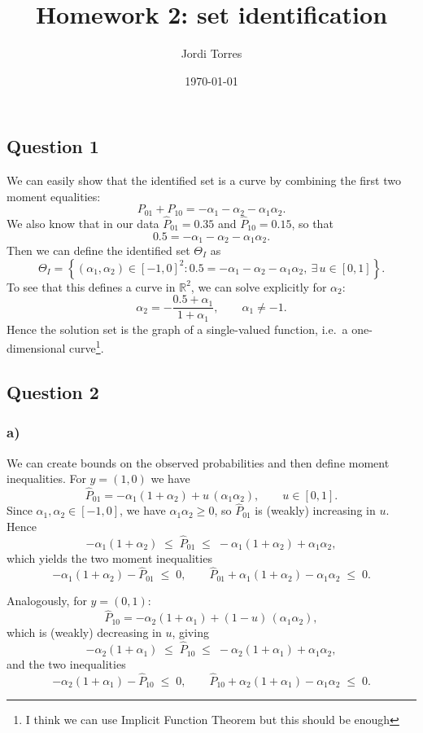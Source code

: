 \documentclass{article}
\begin{document}
\title{Homework 2: set identification}
\author{Jordi Torres}
\date{\today}


\maketitle


\subsection*{Question 1}
We can easily show that the identified set is a curve by combining the first two moment equalities:
\[
P_{01}+P_{10}= -\alpha_1 -\alpha_2- \alpha_1\alpha_2.
\]
We also know that in our data $\hat{P}_{01}=0.35$ and $\hat{P}_{10}=0.15$, so that
\[
0.5= -\alpha_1 -\alpha_2- \alpha_1\alpha_2.
\]
Then we can define the identified set $\Theta_I$ as
\[
\Theta_I= \left\{(\alpha_1, \alpha_2)\in [-1,0]^{2}: 0.5=-\alpha_1 -\alpha_2- \alpha_1\alpha_2,\ \exists\,u\in[0,1]\right\}.
\]
To see that this defines a curve in $\mathbb{R}^2$, we can solve explicitly for $\alpha_2$:
\[
\alpha_2 = -\frac{0.5+\alpha_1}{1+\alpha_1}, \qquad \alpha_1\neq -1.
\]
Hence the solution set is the graph of a single-valued function, i.e.\ a one-dimensional curve\footnote{I think we can use Implicit Function Theorem but this should be enough}.

\subsection*{Question 2}

\subsubsection*{a)}
We can create bounds on the observed probabilities and then define moment inequalities. For $y=(1,0)$ we have
\[
\hat P_{01} = -\alpha_1(1+\alpha_2) + u\,(\alpha_1\alpha_2), \qquad u\in[0,1].
\]
Since $\alpha_1,\alpha_2\in[-1,0]$, we have $\alpha_1\alpha_2\ge 0$, so $\hat P_{01}$ is (weakly) increasing in $u$. Hence
\[
-\alpha_1(1+\alpha_2) \;\le\; \hat P_{01} \;\le\; -\alpha_1(1+\alpha_2) + \alpha_1\alpha_2,
\]
which yields the two moment inequalities
\[
-\alpha_1(1+\alpha_2) - \hat P_{01} \;\le\; 0,
\qquad
\hat P_{01} + \alpha_1(1+\alpha_2) - \alpha_1\alpha_2 \;\le\; 0.
\]

Analogously, for $y=(0,1)$:
\[
\hat P_{10} = -\alpha_2(1+\alpha_1) + (1-u)\,(\alpha_1\alpha_2),
\]
which is (weakly) decreasing in $u$, giving
\[
-\alpha_2(1+\alpha_1) \;\le\; \hat P_{10} \;\le\; -\alpha_2(1+\alpha_1) + \alpha_1\alpha_2,
\]
and the two inequalities
\[
-\alpha_2(1+\alpha_1) - \hat P_{10} \;\le\; 0,
\qquad
\hat P_{10} + \alpha_2(1+\alpha_1) - \alpha_1\alpha_2 \;\le\; 0.
\]
\end{document}
